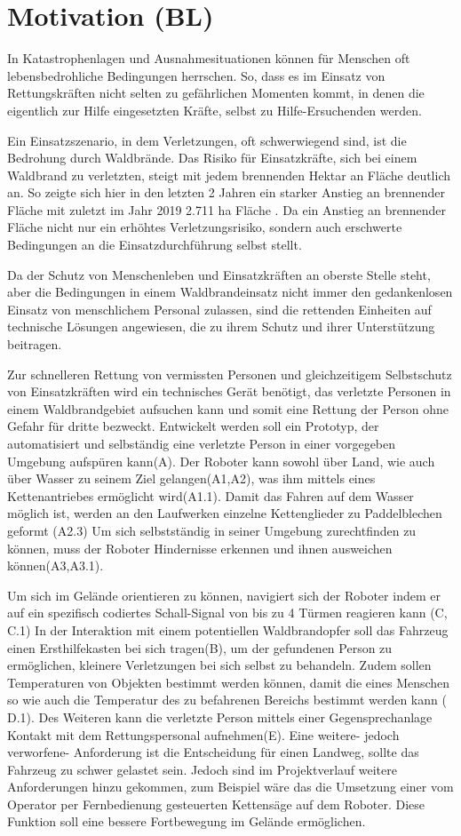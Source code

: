 \documentclass[conference]{IEEEtran}
\begin{document}
\section{Motivation (BL)}
In Katastrophenlagen und Ausnahmesituationen können für Menschen oft lebensbedrohliche Bedingungen herrschen. So, dass es im Einsatz von Rettungskräften nicht selten zu gefährlichen Momenten kommt, in denen die eigentlich zur Hilfe eingesetzten Kräfte, selbst zu Hilfe-Ersuchenden werden. \par
Ein Einsatzszenario, in dem Verletzungen, oft schwerwiegend sind, ist die Bedrohung durch Waldbrände. Das Risiko für Einsatzkräfte, sich bei einem Waldbrand zu verletzten, steigt mit jedem brennenden Hektar an Fläche deutlich an. So zeigte sich hier in den letzten 2 Jahren ein starker Anstieg an brennender Fläche mit zuletzt im Jahr 2019 2.711 ha Fläche \cite[S.7B1]{stat1}. Da ein Anstieg an brennender Fläche nicht nur ein erhöhtes Verletzungsrisiko, sondern auch erschwerte Bedingungen an die Einsatzdurchführung selbst stellt. \par
Da der Schutz von Menschenleben und Einsatzkräften an oberste Stelle steht, aber die Bedingungen in einem Waldbrandeinsatz nicht immer den gedankenlosen Einsatz von menschlichem Personal zulassen, sind die rettenden Einheiten auf technische Lösungen angewiesen, die zu ihrem Schutz und ihrer Unterstützung beitragen.\par 
Zur schnelleren Rettung von vermissten Personen und gleichzeitigem Selbstschutz von Einsatzkräften wird ein technisches Gerät benötigt, das verletzte Personen in einem Waldbrandgebiet aufsuchen kann und somit eine Rettung der Person ohne Gefahr für dritte bezweckt. 
Entwickelt werden soll ein Prototyp, der automatisiert und selbständig eine verletzte Person in einer vorgegeben Umgebung aufspüren kann(A). Der Roboter kann sowohl über Land, wie auch über Wasser zu seinem Ziel gelangen(A1,A2), was ihm mittels eines Kettenantriebes ermöglicht wird(A1.1). Damit das Fahren auf dem Wasser möglich ist, werden an den Laufwerken einzelne Kettenglieder zu Paddelblechen geformt (A2.3)
Um sich selbstständig in seiner Umgebung zurechtfinden zu können, muss der Roboter Hindernisse erkennen und ihnen ausweichen können(A3,A3.1).
\par Um sich im Gelände orientieren zu können, navigiert sich der Roboter indem er auf ein spezifisch codiertes Schall-Signal von bis zu 4 Türmen reagieren kann (C, C.1)
In der Interaktion mit einem potentiellen Waldbrandopfer soll das Fahrzeug einen Ersthilfekasten bei sich tragen(B), um der gefundenen Person zu ermöglichen, kleinere Verletzungen bei sich selbst zu behandeln. Zudem sollen Temperaturen von Objekten bestimmt werden können, damit die eines Menschen so wie auch die Temperatur des zu befahrenen Bereichs bestimmt werden kann ( D.1). Des Weiteren kann die verletzte Person mittels einer Gegensprechanlage Kontakt mit dem Rettungspersonal aufnehmen(E). Eine weitere- jedoch verworfene- Anforderung ist die Entscheidung für einen Landweg, sollte das Fahrzeug zu schwer gelastet sein. Jedoch sind im Projektverlauf weitere Anforderungen hinzu gekommen, zum Beispiel wäre das die Umsetzung einer vom Operator per Fernbedienung gesteuerten Kettensäge auf dem Roboter. Diese Funktion soll eine bessere Fortbewegung im Gelände ermöglichen.
\end{document}
